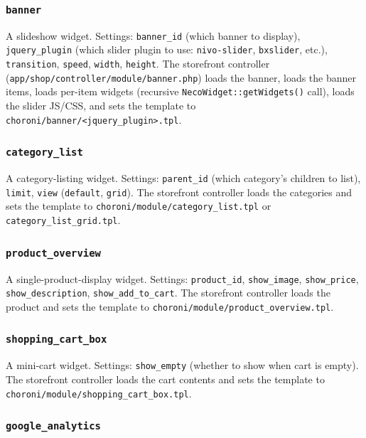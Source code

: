 \documentclass[11pt,a4paper]{article}
\begin{document}
\subsubsection{\texttt{banner}}

A slideshow widget. Settings: \texttt{banner\_id} (which banner
to display), \texttt{jquery\_plugin} (which slider plugin to use:
\texttt{nivo-slider}, \texttt{bxslider}, etc.),
\texttt{transition}, \texttt{speed}, \texttt{width},
\texttt{height}. The storefront controller
(\texttt{app/shop/controller/module/banner.php}) loads the
banner, loads the banner items, loads per-item widgets
(recursive \texttt{NecoWidget::getWidgets()} call), loads the
slider JS/CSS, and sets the template to
\texttt{choroni/banner/<jquery\_plugin>.tpl}.

\subsubsection{\texttt{category\_list}}

A category-listing widget. Settings: \texttt{parent\_id} (which
category's children to list), \texttt{limit}, \texttt{view}
(\texttt{default}, \texttt{grid}). The storefront controller loads
the categories and sets the template to
\texttt{choroni/module/category\_list.tpl} or
\texttt{category\_list\_grid.tpl}.

\subsubsection{\texttt{product\_overview}}

A single-product-display widget. Settings: \texttt{product\_id},
\texttt{show\_image}, \texttt{show\_price}, \texttt{show\_description},
\texttt{show\_add\_to\_cart}. The storefront controller loads the
product and sets the template to
\texttt{choroni/module/product\_overview.tpl}.

\subsubsection{\texttt{shopping\_cart\_box}}

A mini-cart widget. Settings: \texttt{show\_empty} (whether to
show when cart is empty). The storefront controller loads the cart
contents and sets the template to
\texttt{choroni/module/shopping\_cart\_box.tpl}.

\subsubsection{\texttt{google\_analytics}}
\end{document}
